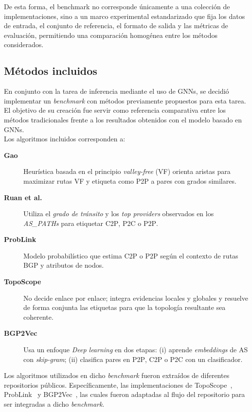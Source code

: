 De esta forma, el benchmark no corresponde únicamente a una colección de implementaciones, sino a un marco experimental estandarizado que fija los datos de entrada, el conjunto de referencia, el formato de salida y las métricas de evaluación, permitiendo una comparación homogénea entre los métodos considerados.
\subsection{Métodos incluidos}
En conjunto con la tarea de inferencia mediante el uso de GNNs, se decidió implementar un \textit{benchmark} con métodos previamente propuestos para esta tarea. El objetivo de su creación fue servir como referencia comparativa entre los métodos tradicionales frente a los resultados obtenidos con el modelo basado en GNNs.\\

Los algoritmos incluidos corresponden a:
\begin{description}
  \item[\textbf{Gao}~\cite{InferringASRelatioships2001}]
  Heurística basada en el principio \textit{valley-free} (VF) orienta aristas para maximizar rutas VF y etiqueta como \textsc{P2P} a pares con grados similares.

  \item[\textbf{Ruan et al.}~\cite{computing-observed-autonomous-system-relationships-in-the-internet}]
  Utiliza el \emph{grado de tránsito} y los \emph{top providers} observados en los \textit{AS\_PATHs} para etiquetar \textsc{C2P}, \textsc{P2C} o \textsc{P2P}.

  \item[\textbf{ProbLink}~\cite{ProbLink}]
  Modelo probabilístico que estima \textsc{C2P} o \textsc{P2P} según el contexto de rutas BGP y atributos de nodos.

  \item[\textbf{TopoScope}~\cite{topoScopePaper}]
  No decide enlace por enlace; integra evidencias locales y globales y resuelve de forma conjunta las etiquetas para que la topología resultante sea coherente.
  \item[\textbf{BGP2Vec}~\cite{UnveilingtheTypeRelationshipBetweenAutonomousSystemsUsingDeepLearning}]
  Usa un enfoque
  \textit{Deep learning} en dos etapas: (i) aprende \textit{embeddings} de AS con \textit{skip-gram}; (ii) clasifica pares en \textsc{P2P}, \textsc{C2P} o \textsc{P2C} con un clasificador.
\end{description}

Los algoritmos utilizados en dicho \textit{benchmark} fueron extraídos de diferentes repositorios públicos. Específicamente, las implementaciones de TopoScope~\cite{topoScopeCode}, ProbLink~\cite{problinkCode} y BGP2Vec~\cite{BGP2VecCode}, las cuales fueron adaptadas al flujo del repositorio para ser integradas a dicho \textit{benchmark}.\\

